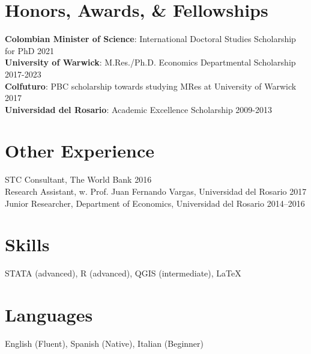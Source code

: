 \documentclass[10pt,letterpaper]{article}
\renewenvironment{itemize}{
	\begin{list}{}{
			\setlength{\leftmargin}{1.5em}
		}
	}{
	\end{list}
}
\begin{document}
	\section*{Honors, Awards, \& Fellowships}
	
	\begin{itemize}
		\item {\bf Colombian Minister of Science}: International Doctoral Studies Scholarship for PhD \hfill 2021
		\\ {\bf University of Warwick}: M.Res./Ph.D. Economics Departmental Scholarship \hfill 2017-2023
		\\ {\bf Colfuturo}: PBC scholarship towards studying MRes at University of Warwick \hfill 2017
		\\ {\bf Universidad del Rosario}: Academic Excellence Scholarship \hfill 2009-2013
	\end{itemize}
	
	\section*{Other Experience}
	
	\begin{itemize}
		\item STC Consultant, The World Bank \hfill 2016
		\\ Research Assistant, w. Prof. Juan Fernando Vargas, Universidad del Rosario \hfill 2017
		\\
		Junior Researcher, Department of Economics, Universidad del Rosario \hfill 2014--2016
	\end{itemize}
	
	
	\section*{Skills}
	
	\begin{itemize}
		\item STATA (advanced), R (advanced), QGIS (intermediate), \LaTeX
	\end{itemize}
	
	\section*{Languages}
	\begin{itemize}
		\item English (Fluent), Spanish (Native), Italian (Beginner)
	\end{itemize}
	
\end{document}
